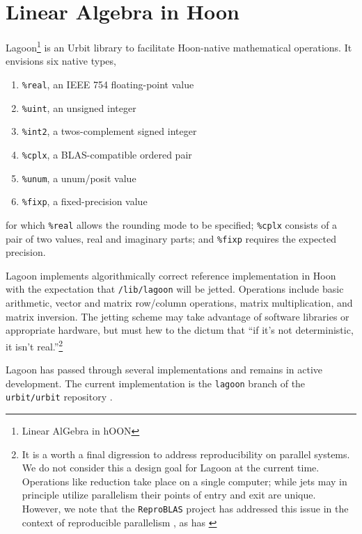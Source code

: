 \documentclass[twoside]{article}
\begin{document}
\section{Linear Algebra in Hoon}

Lagoon\footnote{Linear AlGebra in hOON} is an Urbit library to facilitate Hoon-native mathematical operations.  It envisions six native types,

\begin{enumerate}
  \item  \lstinline[style=inlinecode]{%real}, an IEEE 754 floating-point value
  \item  \lstinline[style=inlinecode]{%uint}, an unsigned integer
  \item  \lstinline[style=inlinecode]{%int2}, a twos-complement signed integer
  \item  \lstinline[style=inlinecode]{%cplx}, a BLAS-compatible ordered pair
  \item  \lstinline[style=inlinecode]{%unum}, a unum/posit value
  \item  \lstinline[style=inlinecode]{%fixp}, a fixed-precision value
\end{enumerate}

\noindent
for which \lstinline[style=inlinecode]{%real} allows the rounding mode to be specified; \lstinline[style=inlinecode]{%cplx} consists of a pair of two values, real and imaginary parts; and \lstinline[style=inlinecode]{%fixp} requires the expected precision.

Lagoon implements algorithmically correct reference implementation in Hoon with the expectation that \lstinline[style=inlinecode]{/lib/lagoon} will be jetted.  Operations include basic arithmetic, vector and matrix row/column operations, matrix multiplication, and matrix inversion.  The jetting scheme may take advantage of software libraries or appropriate hardware, but must hew to the dictum that “if it's not deterministic, it isn't real.”\footnote{It is a worth a final digression to address reproducibility on parallel systems.  We do not consider this a design goal for Lagoon at the current time.  Operations like reduction take place on a single computer; while jets may in principle utilize parallelism their points of entry and exit are unique.  However, we note that the \texttt{ReproBLAS} project has addressed this issue in the context of reproducible parallelism \citep{ReproBLAS}, as has \citeauthor{Chohra2016}}  %

Lagoon has passed through several implementations and remains in active development.  The current implementation is the \texttt{lagoon} branch of the \texttt{urbit/urbit} repository \citep{Urbit}.
\end{document}
